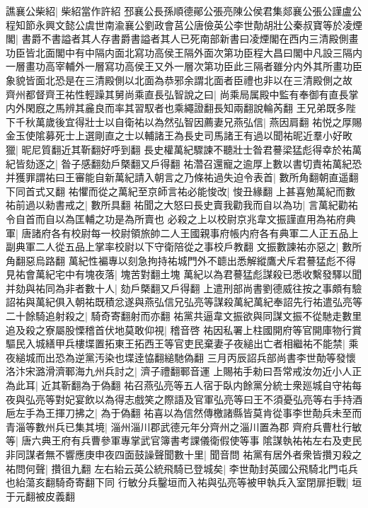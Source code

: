 譙襄公柴紹|{
	柴紹當作許紹}
邳襄公長孫順德鄖公張亮陳公侯君集郯襄公張公謹盧公程知節永興文懿公虞世南渝襄公劉政會莒公唐儉英公李世勣胡壯公秦叔寶等於凌煙閣|{
	書爵不書謚者其人存書爵書謚者其人已死南部新書曰凌煙閣在西内三清殿側畫功臣皆北面閣中有中隔内面北寫功高侯王隔外面次第功臣程大昌曰閣中凡設三隔内一層畫功高宰輔外一層寫功高侯王又外一層次第功臣此三隔者雖分内外其所畫功臣象貌皆面北恐是在三清殿側以北面為恭邪余謂北面者臣禮也非以在三清殿側之故}
齊州都督齊王祐性輕躁其舅尚乘直長弘智說之曰|{
	尚乘局属殿中監有奉御有直長掌内外閑廐之馬辨其麄良而率其習馭者也乘繩證翻長知兩翻說輪芮翻}
王兄弟既多陛下千秋萬歲後宜得壯士以自衛祐以為然弘智因薦妻兄燕弘信|{
	燕因肩翻}
祐悦之厚賜金玉使隂募死士上選剛直之士以輔諸王為長史司馬諸王有過以聞祐昵近羣小好畋獵|{
	昵尼質翻近其靳翻好呼到翻}
長史權萬紀驟諫不聽壯士昝君謩梁猛彪得幸於祐萬紀皆劾逐之|{
	昝子感翻劾戶槩翻又戶得翻}
祐濳召還寵之逾厚上數以書切責祐萬紀恐并獲罪謂祐曰王審能自新萬紀請入朝言之乃條祐過失迫令表首|{
	數所角翻朝直遥翻下同首式又翻}
祐懼而從之萬紀至京師言祐必能悛改|{
	悛丑緣翻}
上甚喜勉萬紀而數祐前過以勑書戒之|{
	數所具翻}
祐聞之大怒曰長史賣我勸我而自以為功|{
	言萬紀勸祐令自首而自以為匡輔之功是為所賣也}
必殺之上以校尉京兆韋文振謹直用為祐府典軍|{
	唐諸府各有校尉每一校尉領旅帥二人王國親事府帳内府各有典軍二人正五品上副典軍二人從五品上掌率校尉以下守衛陪從之事校戶教翻}
文振數諫祐亦惡之|{
	數所角翻惡烏路翻}
萬紀性褊專以刻急拘持祐城門外不聼出悉解縱鷹犬斥君謩猛彪不得見祐會萬紀宅中有塊夜落|{
	塊苦對翻土塊}
萬紀以為君謩猛彪謀殺已悉收繫發驛以聞并劾與祐同為非者數十人|{
	劾戶槩翻又戶得翻}
上遣刑部尚書劉德威往按之事頗有驗詔祐與萬紀俱入朝祐既積忿遂與燕弘信兄弘亮等謀殺萬紀萬紀奉詔先行祐遣弘亮等二十餘騎追射殺之|{
	騎奇寄翻射而亦翻}
祐黨共逼韋文振欲與同謀文振不從馳走數里追及殺之寮屬股慄稽首伏地莫敢仰視|{
	稽音啓}
祐因私署上柱國開府等官開庫物行賞驅民入城繕甲兵樓堞置拓東王拓西王等官吏民棄妻子夜縋出亡者相繼祐不能禁|{
	乘夜縋城而出恐為逆黨汚染也堞逹恊翻縋馳偽翻}
三月丙辰詔兵部尚書李世勣等發懷洛汴宋潞滑濟鄆海九州兵討之|{
	濟子禮翻鄆音運}
上賜祐手勑曰吾常戒汝勿近小人正為此耳|{
	近其靳翻為于偽翻}
祐召燕弘亮等五人宿于臥内餘黨分統士衆廵城自守祐每夜與弘亮等對妃宴飲以為得志戲笑之際語及官軍弘亮等曰王不須憂弘亮等右手持酒巵左手為王揮刀拂之|{
	為于偽翻}
祐喜以為信然傳檄諸縣皆莫肯從事李世勣兵未至而青淄等數州兵已集其境|{
	淄州淄川郡武德元年分齊州之淄川置為郡}
齊府兵曹杜行敏等|{
	唐六典王府有兵曹參軍專掌武官簿書考課儀衛假使等事}
隂謀執祐祐左右及吏民非同謀者無不響應庚申夜四面鼓譟聲聞數十里|{
	聞音問}
祐黨有居外者衆皆攢刃殺之祐問何聲|{
	攢徂九翻}
左右紿云英公統飛騎已登城矣|{
	李世勣封英國公飛騎北門屯兵也紿蕩亥翻騎奇寄翻下同}
行敏分兵鑿垣而入祐與弘亮等被甲執兵入室閉扉拒戰|{
	垣于元翻被皮義翻}
